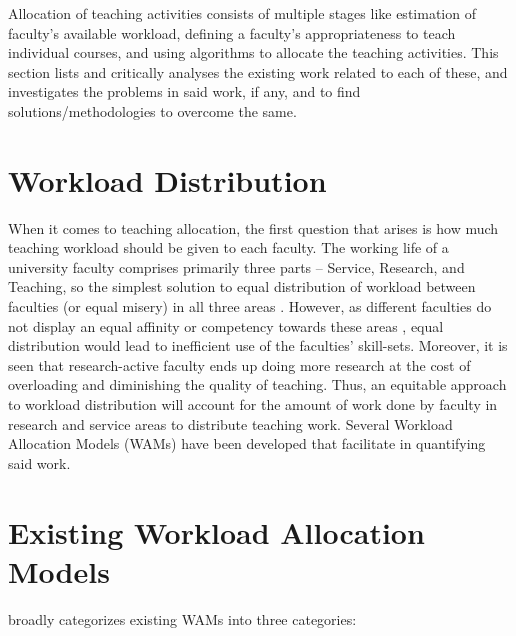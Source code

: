 Allocation of teaching activities consists of multiple stages like estimation of faculty's available workload, defining a faculty's appropriateness to teach individual courses, and using algorithms to allocate the teaching activities. This section lists and critically analyses the existing work related to each of these, and investigates the problems in said work, if any, and to find solutions/methodologies to overcome the same.

\section{Workload Distribution}

When it comes to teaching allocation, the first question that arises is how much teaching workload should be given to each faculty. The working life of a university faculty comprises primarily three parts – Service, Research, and Teaching, so the simplest solution to equal distribution of workload between faculties (or equal misery) in all three areas \parencite{gray1989university}. However, as different faculties do not display an equal affinity or competency towards these areas \parencite{finlay1994management}, equal distribution would lead to inefficient use of the faculties' skill-sets. Moreover, it is seen that research-active faculty ends up doing more research at the cost of overloading and diminishing the quality of teaching. Thus, an equitable approach to workload distribution will account for the amount of work done by faculty in research and service areas to distribute teaching work. Several Workload Allocation Models (WAMs) have been developed that facilitate in quantifying said work.

\section{Existing Workload Allocation Models}

\parencite{vardi2009impacts} broadly categorizes existing WAMs into three categories:

